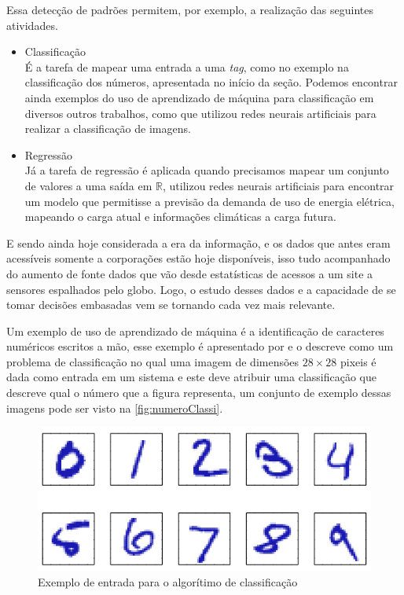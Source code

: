\documentclass[
    12pt,
    oneside,
    a4paper,
    english,
    brazil
]{abntex2}
\begin{document}
Essa detecção de padrões permitem, por exemplo, a realização das seguintes
atividades.
\begin{itemize}
    \item Classificação\\
        É a tarefa de mapear uma entrada a uma \textit{tag}, como no exemplo na
        classificação dos números, apresentada no início da seção. Podemos
        encontrar ainda exemplos do uso de aprendizado de máquina para
        classificação em diversos outros trabalhos, como
         que utilizou redes neurais artificiais
        para realizar a classificação de imagens.
    \item Regressão\\
        Já a tarefa de regressão é aplicada quando precisamos mapear um
        conjunto de valores a uma saída em $ \mathbb{R} $,
         utilizou redes neurais artificiais para
        encontrar um modelo que permitisse a previsão da demanda de uso de
        energia elétrica, mapeando o carga atual e informações climáticas a
        carga futura.
\end{itemize}

E sendo ainda hoje considerada a era da informação, e os dados que antes eram
acessíveis somente a corporações estão hoje disponíveis, isso tudo acompanhado
do aumento de fonte dados que vão desde estatísticas de acessos a um site a
sensores espalhados pelo globo. Logo, o estudo desses dados e a capacidade de
se tomar decisões embasadas vem se tornando cada vez mais
relevante.\cite{ethem}

Um exemplo de uso de aprendizado de máquina é a identificação de caracteres
numéricos escritos a mão, esse exemplo é apresentado por
 e o descreve como um problema de classificação no
qual uma imagem de dimensões $28 \times 28$ pixeis é dada como entrada em um
sistema e este deve atribuir uma classificação que descreve qual o número
que a figura representa, um conjunto de exemplo dessas imagens pode ser visto
na \autoref{fig:numeroClassi}.

\begin{figure}
    \centering
    \caption{Exemplo de entrada para o algorítimo de
        classificação}\label{fig:numeroClassi}
    \includegraphics[width=.5\linewidth]{images/numeroClassificacao.png}
\end{figure}
\end{document}
